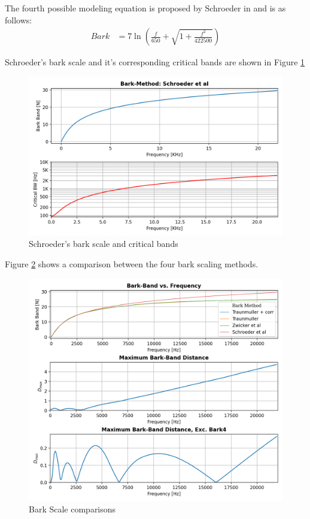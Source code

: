 The fourth possible modeling equation is proposed by
Schroeder in \cite{SchroederScale} and is as follows:
\begin{align}
    Bark & = 7\ln \left( \frac{f}{650} + \sqrt{1 + \frac{f^{2}}{422500} }  \right)
\end{align}

Schroeder's bark scale and it's corresponding critical bands
are shown in Figure \ref{fig:Schroeder_bark}
\begin{figure}[H]
    \centering
    \includegraphics[width=0.75\linewidth]{Experiments/images/Schroeder}
    \caption{Schroeder's bark scale and critical bands}\label{fig:Schroeder_bark}
\end{figure}

Figure \ref{fig:bark_comparison} shows a comparison between the four
bark scaling methods.
\begin{figure}[H]
    \centering
    \includegraphics[width=0.95\linewidth]{Experiments/images/bark_comparison2}
    \caption{Bark Scale comparisons}\label{fig:bark_comparison}
\end{figure}

